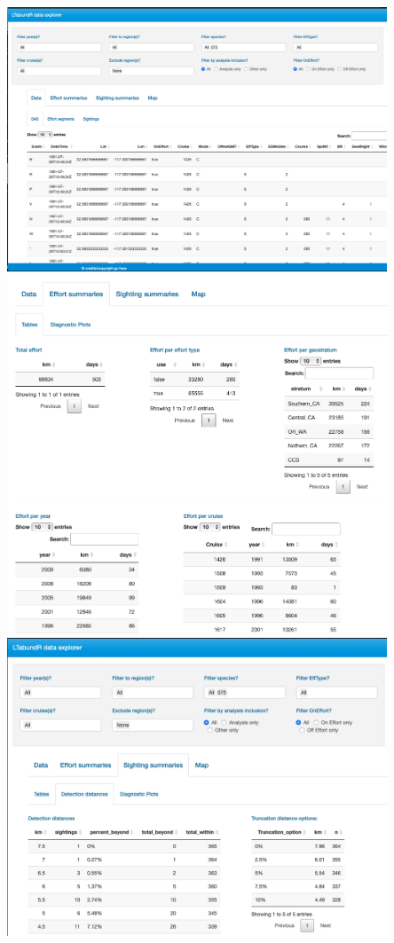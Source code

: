 \documentclass[
]{book}
\begin{document}
\includegraphics[width=0.85\textwidth,height=\textheight]{img/app-1.png}
~\\
\includegraphics[width=0.85\textwidth,height=\textheight]{img/app-2.png}
~\\
\includegraphics[width=0.85\textwidth,height=\textheight]{img/app-3.png}
\end{document}
